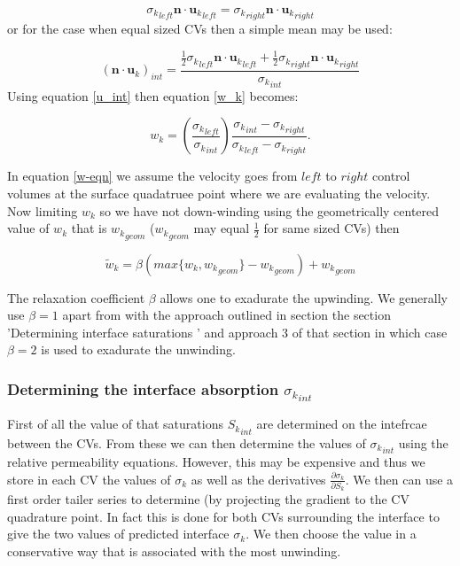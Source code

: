 \begin{equation}
{\sigma_k}_{left} {{\mathbf n}\cdot{\mathbf u}_k}_{left} =  {\sigma_k}_{right} {{\mathbf n}\cdot{\mathbf u}_k}_{right}
\label{u_int}
\end{equation}
or for the case when equal sized CVs then a simple mean may be used:

\begin{equation}
({{\mathbf n}\cdot{\mathbf u}_k})_{int}= \frac{\frac{1}{2} {\sigma_k}_{left}{{\mathbf n}\cdot{\mathbf u}_k}_{left}
+ \frac{1}{2}{\sigma_k}_{right} {{\mathbf n}\cdot{\mathbf u}_k}_{right}}{{\sigma_k}_{int}}
\end{equation}
Using equation \ref{u_int} then equation \ref{w_k} becomes:

\begin{equation}
w_k=\left( \frac{{\sigma_k}_{left}}{{\sigma_k}_{int}} \right)
\frac{ {\sigma_k}_{int} - {\sigma_k}_{right}}
{ {\sigma_k}_{left} - {\sigma_k}_{right}}
\label{w-eqn}.
\end{equation}

In equation \ref{w-eqn} we assume the velocity goes from $left$ to $right$
control volumes at the surface quadatruee point
where we are evaluating the velocity. Now limiting
$w_k$ so we have not down-winding using the
geometrically centered value of $w_k$ that is ${w_k}_{geom}$
(${w_k}_{geom}$ may equal $\frac{1}{2}$ for same sized CVs)
then

\begin{equation}
\tilde w_k=\beta (max\{ w_k, {w_k}_{geom} \}-{w_k}_{geom}) + {w_k}_{geom}
\end{equation}

The relaxation coefficient $\beta$ allows one to
exadurate the upwinding. We generally use $\beta=1$ apart
from with the approach outlined in section
the section '{Determining interface saturations  }'
and approach 3 of that section in which case $\beta=2$ is
used to exadurate the unwinding.



\subsubsection{Determining the interface absorption ${\sigma_k}_{int}$ }

First of all the value of that saturations ${S_k}_{int}$
are determined on the intefrcae between the CVs.
From these we can then determine the values of ${\sigma_k}_{int}$
using the relative permeability equations. However,
this may be expensive and thus we store
in each CV the values of $\sigma_k$ as well
as the derivatives $\frac{\partial \sigma_k}{\partial S_k}$. We then
can use a first order tailer series to determine
(by projecting the gradient
to the CV quadrature point. In fact this is done for
both CVs surrounding the interface to give the
two values of predicted interface ${\sigma_k}$.
We then choose the value in a conservative way that
is associated with the most unwinding.

